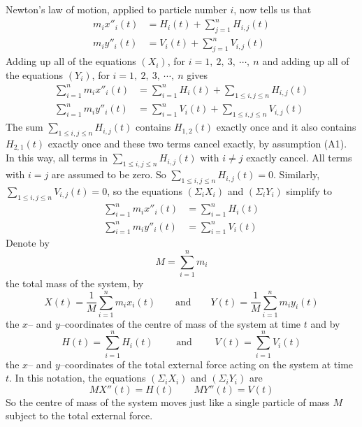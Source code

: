 \noindent
Newton's law of motion, applied to particle number $i$,  now tells us that
\begin{align}
m_i x''_i(t)&= H_i(t)+\sum_{j=1}^n H_{i,j}(t)\tag{$X_i$}\\
m_i y''_i(t)&= V_i(t)+\sum_{j=1}^n V_{i,j}(t)\tag{$Y_i$}
\end{align}
Adding up all of the equations $(X_i)$, for
$i=1,\ 2,\ 3,\ \cdots,\ n$
and adding up all of the equations $(Y_i)$,
for $i=1,\ 2,\ 3,\ \cdots,\ n$ gives
\begin{align}
\sum_{i=1}^n m_i x''_i(t)&= \sum_{i=1}^n H_i(t)+\sum_{1\le i,j\le n} H_{i,j}(t)
      \tag{$\Sigma_iX_i$}\\
\sum_{i=1}^n m_i y''_i(t)&= \sum_{i=1}^n V_i(t)+\sum_{1\le i,j\le n} V_{i,j}(t)
      \tag{$\Sigma_iY_i$}
\end{align}
The sum $\sum_{1\le i,j\le n} H_{i,j}(t)$ contains $H_{1,2}(t)$
exactly once and it also contains $H_{2,1}(t)$ exactly once and these two
terms cancel exactly, by assumption (A1). In this way, all terms in
$\sum_{1\le i,j\le n} H_{i,j}(t)$
with $i\ne j$ exactly cancel. All terms with $i=j$ are assumed to be zero.
So $\sum_{1\le i,j\le n} H_{i,j}(t)=0$. Similarly,
$\sum_{1\le i,j\le n} V_{i,j}(t)=0$, so the equations $(\Sigma_iX_i)$
and $(\Sigma_iY_i)$ simplify to
\begin{align}
\sum_{i=1}^n m_i x''_i(t)&= \sum_{i=1}^n H_i(t)
              \tag{$\Sigma_iX_i$}\\
\sum_{i=1}^n m_i y''_i(t)&= \sum_{i=1}^n V_i(t)
     \tag{$\Sigma_iY_i$}
\end{align}
Denote by
\begin{equation*}
M=\sum\limits_{i=1}^n m_i
\end{equation*}
the total mass of the system, by \begin{equation*}
X(t)=\frac{1}{M}\sum\limits_{i=1}^n m_ix_i(t)\qquad \text{and}\qquad
Y(t)=\frac{1}{M}\sum\limits_{i=1}^n m_iy_i(t)
\end{equation*}
the $x$-- and $y$--coordinates of the centre of mass of the system
at time $t$ and by
\begin{equation*}
H(t)=\sum\limits_{i=1}^n H_i(t) \qquad\text{ and }\qquad
V(t)=\sum\limits_{i=1}^n V_i(t)
\end{equation*}
the $x$-- and $y$--coordinates of the total external force acting
on the system at time $t$. In this notation, the equations
$(\Sigma_iX_i)$ and $(\Sigma_iY_i)$ are
\begin{equation}\label{eq:TRQcofmeqn}
MX''(t)=H(t)\qquad MY''(t)=V(t)
\end{equation}
So the centre of mass of the system moves just like a single particle of
mass $M$ subject to the total external force.

